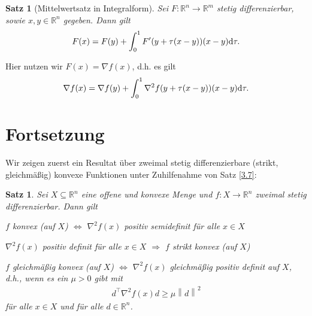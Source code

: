 \documentclass[a4paper,reqno]{amsart}
\newtheorem{satz}[theorem]{Satz}
\theoremstyle{definition}
\theoremstyle{remark}
\newcommand\norm[1]{\left\lVert#1\right\rVert}
\newcommand{\dd}{\textnormal{d}}
\begin{document}
\def\thesection{\Alph{section}}
\setcounter{section}{1}\setcounter{theorem}{2}
\begin{satz}[Mittelwertsatz in Integralform]\label{MWS_Intform}%
    Sei $F\colon\mathbb{R}^n\to\mathbb{R}^m$ stetig differenzierbar,
    sowie $x,y\in\mathbb{R}^n$ gegeben. Dann gilt
    \begin{align*}
        F(x) = F(y) + \int_0^1 F'(y+\tau(x-y))(x-y)\dd\tau.
    \end{align*}
\end{satz}

Hier nutzen wir $F(x)=\nabla f(x)$, d.h. es gilt
    \begin{align}\label{MWS_intform}
        \nabla f(x) = \nabla f(y) + \int_0^1 \nabla^2 f(y+\tau(x-y))(x-y)\dd\tau.
    \end{align}

\def\thesection{\arabic{section}}
\section*{Fortsetzung}

Wir zeigen zuerst ein Resultat über zweimal stetig differenzierbare
(strikt, gleichmäßig) konvexe Funktionen unter Zuhilfenahme von Satz
\ref{3.7}:
\setcounter{section}{3}\setcounter{theorem}{7}
\begin{satz}\label{satz3.8}%
    Sei $X\subseteq\mathbb{R}^n$ eine offene und konvexe Menge und
    $f\colon X\to\mathbb{R}^n$ zweimal stetig differenzierbar. Dann gilt
    \begin{compactenum}[(a)]
        \item $f$ konvex (auf $X$) $\Longleftrightarrow$ $\nabla^2 f(x)$
            positiv semidefinit für alle $x\in X$
        \item $\nabla^2 f(x)$ positiv definit für alle $x\in X$
            $\Longrightarrow$ $f$ strikt konvex (auf $X$)
        \item $f$ gleichmäßig konvex (auf $X$) $\Longleftrightarrow$
            $\nabla^2 f(x)$ gleichmäßig positiv definit auf $X$, d.h.,
            wenn es ein $\mu>0$ gibt mit
            \begin{align}\label{eq:3.11}
                d^\top\nabla^2 f(x)d\geq\mu\norm{d}^2
            \end{align}
            für alle $x\in X$ und für alle $d\in\mathbb{R}^n$.
    \end{compactenum}
\end{satz}
\end{document}
